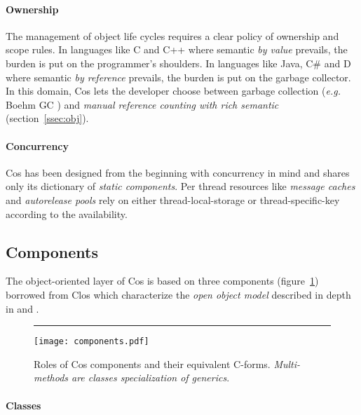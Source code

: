 \documentclass[preprint,10pt]{sigplanconf}
\newcommand{\abbrev}[1]{{\em #1}\xspace}
\newcommand{\eg}{\abbrev{e.g.}}
\newcommand{\ProgLang}[1]{{\sc #1}\xspace}
\newcommand{\Cpp}       {\ProgLang{C{\small ++}}}
\newcommand{\Csharp}    {\ProgLang{C{\small\#}}}
\newcommand{\Clos}      {\ProgLang{Clos}}
\newcommand{\Cos}       {\ProgLang{Cos}}
\newcommand{\Java}      {\ProgLang{Java}}
\newcommand{\hr}{\rule{\columnwidth}{0.33pt}}
\begin{document}
\paragraph{Ownership}

The management of object life cycles requires a clear policy of ownership and scope rules. In languages like C and \Cpp where semantic {\em by value} prevails, the burden is put on the programmer's shoulders. In languages like \Java, \Csharp and D where semantic {\em by reference} prevails, the burden is put on the garbage collector. In this domain, \Cos lets the developer choose between garbage collection (\eg Boehm GC \cite{boehm02}) and {\em manual reference counting with rich semantic} (section~\ref{ssec:obj}).

\paragraph{Concurrency}

\Cos has been designed from the beginning with concurrency in mind and shares only its dictionary of {\em static components}. Per thread resources like {\em message caches} and {\em autorelease pools} rely on either thread-local-storage or thread-specific-key according to the availability.





\subsection{Components}

The object-oriented layer of \Cos is based on three components (figure~\ref{fig:cgm}) borrowed from \Clos which characterize the {\em open object model} described in depth in \cite{clos89} and \cite{mop91}.

\begin{figure}\hr
\begin{center}
\vspace{-3mm}\hspace{-3mm}
\texttt{[image: components.pdf]}
\vspace{-4mm}
\end{center}
\caption{Roles of \Cos components and their equivalent C-forms. {\em Multi-methods are classes specialization of generics}.\label{fig:cgm}}
\end{figure}

\paragraph{Classes}
\end{document}

